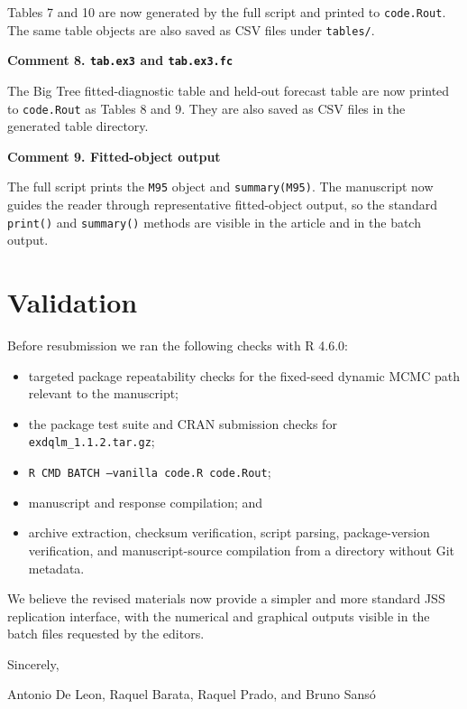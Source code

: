 \documentclass[11pt,letterpaper]{article}
\newcommand{\proglang}[1]{\textsf{#1}}
\newcommand{\code}[1]{\texttt{#1}}
\newcommand{\commentheading}[1]{\vspace{8pt}\noindent\textbf{Comment #1}\par}
\begin{document}
Tables 7 and 10 are now generated by the full script and printed to
\code{code.Rout}. The same table objects are also saved as CSV files under
\code{tables/}.

\commentheading{8. \code{tab.ex3} and \code{tab.ex3.fc}}

The Big Tree fitted-diagnostic table and held-out forecast table are now printed
to \code{code.Rout} as Tables 8 and 9. They are also saved as CSV files in the
generated table directory.

\commentheading{9. Fitted-object output}

The full script prints the \code{M95} object and \code{summary(M95)}. The
manuscript now guides the reader through representative fitted-object output,
so the standard \code{print()} and \code{summary()} methods are visible in the
article and in the batch output.

\section*{Validation}

Before resubmission we ran the following checks with \proglang{R} 4.6.0:
\begin{itemize}
\item targeted package repeatability checks for the fixed-seed dynamic MCMC
  path relevant to the manuscript;
\item the package test suite and CRAN submission checks for
  \code{exdqlm\_1.1.2.tar.gz};
\item \code{R CMD BATCH --vanilla code.R code.Rout};
\item manuscript and response compilation; and
\item archive extraction, checksum verification, script parsing, package-version
  verification, and manuscript-source compilation from a directory without Git
  metadata.
\end{itemize}

We believe the revised materials now provide a simpler and more standard JSS
replication interface, with the numerical and graphical outputs visible in the
batch files requested by the editors.

Sincerely,

Antonio De Leon, Raquel Barata, Raquel Prado, and Bruno Sans\'o
\end{document}
